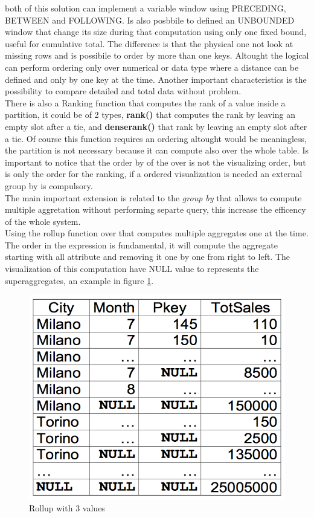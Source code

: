 \documentclass[12pt]{article}
\begin{document}
both of this solution can implement a variable window using PRECEDING, BETWEEN and FOLLOWING. Is also posbbile to defined an UNBOUNDED window that change its size during that computation using only one fixed bound, useful for cumulative total. The difference is that the physical one not look at missing rows and is possibile to order by more than one keys. Altought the logical can perform ordering only over numerical or data type where a distance can be defined and only by one key at the time. Another important characteristics is the possibility to compare detailed and total data without problem.\\
There is also a Ranking function that computes the rank of a value inside a partition, it could be of 2 types, \textbf{rank()} that computes the rank by leaving an empty slot after a tie, and \textbf{denserank()} that rank by leaving an empty slot after a tie. Of course this function requires an ordering altought would be meaningless, the partition is not necessary because it can compute also over the whole table. Is important to notice that the order by of the over is not the visualizing order, but is only the order for the ranking, if a ordered visualization is needed an external group by is compulsory.\\
The main important extension is related to the \textit{group by} that allows to compute multiple aggretation without performing separte query, this increase the efficency of the whole system.\\
Using the rollup function over that computes multiple aggregates one at the time. The order in the expression is fundamental, it will compute the aggregate starting with all attribute and removing it one by one from right to left. The visualization of this computation have NULL value to represents the superaggregates, an example in figure \ref{fig:rollup}.
\begin{figure}[h!]
  \centering
  \includegraphics[width=0.8\linewidth]{images/rollup.png}
  \caption{Rollup with 3 values}
  \label{fig:rollup}
\end{figure}
\end{document}
